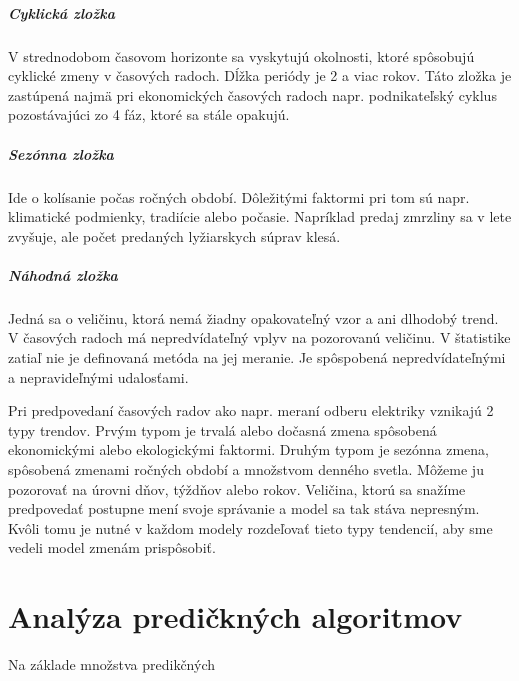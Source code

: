 \documentclass[12pt,oneside,slovak,a4paper]{book}
\begin{document}
\paragraph{Cyklická zložka}
V strednodobom časovom horizonte sa vyskytujú okolnosti, ktoré spôsobujú
cyklické zmeny v časových radoch. Dĺžka periódy je 2 a viac rokov. Táto zložka
je zastúpená najmä pri ekonomických časových radoch napr. podnikateľský cyklus
pozostávajúci zo 4 fáz, ktoré sa stále opakujú\cite{Agrawal2013}.

\paragraph{Sezónna zložka}
Ide o kolísanie počas ročných období. Dôležitými faktormi pri tom sú napr.
klimatické podmienky, tradiície alebo počasie. Napríklad predaj zmrzliny sa
v lete zvyšuje, ale počet predaných lyžiarskych súprav klesá\cite{Agrawal2013}.

\paragraph{Náhodná zložka}
Jedná sa o veličinu, ktorá nemá žiadny opakovateľný vzor a ani dlhodobý trend.
V časových radoch má nepredvídateľný vplyv na pozorovanú veličinu. V štatistike
zatiaľ nie je definovaná metóda na jej meranie. Je spôspobená nepredvídateľnými
a nepravideľnými udalosťami\cite{Agrawal2013}.

Pri predpovedaní časových radov ako napr. meraní odberu elektriky vznikajú
2 typy trendov. Prvým typom je trvalá alebo dočasná zmena spôsobená
ekonomickými alebo ekologickými faktormi. Druhým typom je sezónna zmena,
spôsobená zmenami ročných období a množstvom denného svetla. Môžeme ju pozorovať
na úrovni dňov, týždňov alebo rokov. Veličina, ktorú sa snažíme predpovedať
postupne mení svoje správanie a model sa tak stáva nepresným. Kvôli tomu je
nutné v každom modely rozdeľovať tieto typy tendencií, aby sme vedeli model
zmenám prispôsobiť\cite{Grmanova2016}.



\chapter{Analýza predičkných algoritmov}
Na základe množstva predikčných
\end{document}
